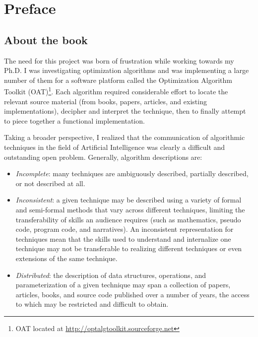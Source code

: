 

\chapter*{Preface}

% 
% 
\section*{About the book}
The need for this project was born of frustration while working towards my Ph.D. I was investigating optimization algorithms and was implementing a large number of them for a software platform called the Optimization Algorithm Toolkit (OAT)\footnote{OAT located at \url{http://optalgtoolkit.sourceforge.net}}. Each algorithm required considerable effort to locate the relevant source material (from books, papers, articles, and existing implementations), decipher and interpret the technique, then to finally attempt to piece together a functional implementation. 

Taking a broader perspective, I realized that the communication of algorithmic techniques in the field of Artificial Intelligence was clearly a difficult and outstanding open problem. Generally, algorithm descriptions are:

\begin{itemize}
	\item \emph{Incomplete}: many techniques are ambiguously described, partially described, or not described at all.
	\item \emph{Inconsistent}: a given technique may be described using a variety of formal and semi-formal methods that vary across different techniques, limiting the transferability of skills an audience requires (such as mathematics, pseudo code, program code, and narratives). An inconsistent representation for techniques mean that the skills used to understand and internalize one technique may not be transferable to realizing different techniques or even extensions of the same technique.
	\item \emph{Distributed}: the description of data structures, operations, and parameterization of a given technique may span a collection of papers, articles, books, and source code published over a number of years, the access to which may be restricted and difficult to obtain.
\end{itemize}

